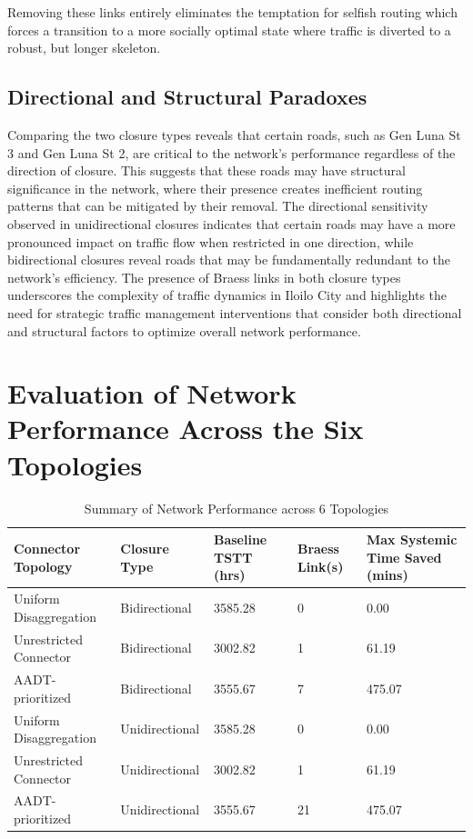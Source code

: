 Removing these links entirely eliminates the temptation for selfish routing which forces a transition to a more socially optimal state where traffic is diverted to a robust, but longer skeleton.

\subsection{Directional and Structural Paradoxes}
\label{sec:directional_structural_paradoxes}
Comparing the two closure types reveals that certain roads, such as Gen Luna St 3 and Gen Luna St 2, are critical to the network's performance regardless of the direction of closure. This suggests that these roads may have structural significance in the network, where their presence creates inefficient routing patterns that can be mitigated by their removal. The directional sensitivity observed in unidirectional closures indicates that certain roads may have a more pronounced impact on traffic flow when restricted in one direction, while bidirectional closures reveal roads that may be fundamentally redundant to the network's efficiency. The presence of Braess links in both closure types underscores the complexity of traffic dynamics in Iloilo City and highlights the need for strategic traffic management interventions that consider both directional and structural factors to optimize overall network performance.

\section{Evaluation of Network Performance Across the Six Topologies}
\label{sec:eval_6}

{
\begin{table}[htbp]
\centering
\small 
\setlength{\tabcolsep}{4pt} 
\renewcommand{\thetable}{4.3}


\begin{tabular}{|p{3.8cm}|p{2.5cm}|p{2cm}|p{2.5cm}|p{2.5cm}|} 
\hline
\textbf{Connector Topology} & \textbf{Closure Type} & \textbf{Baseline TSTT (hrs)} & \textbf{Braess Link(s)} & \textbf{Max Systemic Time Saved (mins)} \\ \hline

Uniform Disaggregation & Bidirectional & 3585.28 & 0 & 0.00 \\ \hline
Unrestricted Connector & Bidirectional & 3002.82 & 1 & 61.19 \\ \hline
AADT-prioritized & Bidirectional & 3555.67 & 7 & 475.07 \\ \hline
Uniform Disaggregation & Unidirectional & 3585.28 & 0 & 0.00 \\ \hline
Unrestricted Connector & Unidirectional & 3002.82 & 1 & 61.19 \\ \hline
AADT-prioritized & Unidirectional & 3555.67 & 21 & 475.07 \\ \hline
\end{tabular}

\caption{Summary of Network Performance across 6 Topologies}
\label{tab:5.3}
\end{table}
}

